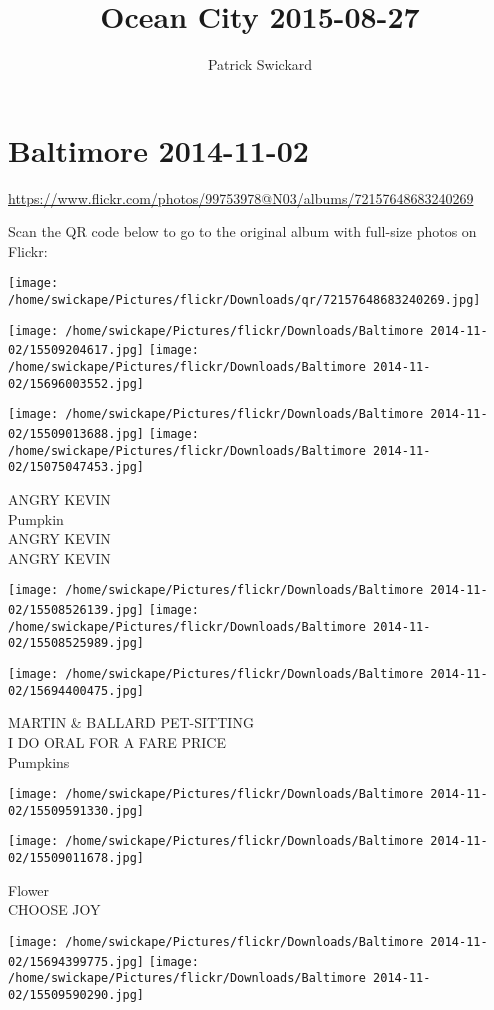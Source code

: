 \documentclass[10pt,letterpaper]{article}
\title{Ocean City 2015-08-27}
\author{Patrick Swickard}
\date{}
\begin{document}
\section*{Baltimore 2014-11-02}

\url{https://www.flickr.com/photos/99753978@N03/albums/72157648683240269}

Scan the QR code below to go to the original album with full-size photos on Flickr:

\texttt{[image: /home/swickape/Pictures/flickr/Downloads/qr/72157648683240269.jpg]}
\pagebreak

\texttt{[image: /home/swickape/Pictures/flickr/Downloads/Baltimore 2014-11-02/15509204617.jpg]}
\texttt{[image: /home/swickape/Pictures/flickr/Downloads/Baltimore 2014-11-02/15696003552.jpg]}

\texttt{[image: /home/swickape/Pictures/flickr/Downloads/Baltimore 2014-11-02/15509013688.jpg]}
\texttt{[image: /home/swickape/Pictures/flickr/Downloads/Baltimore 2014-11-02/15075047453.jpg]}

ANGRY KEVIN\\
Pumpkin\\
ANGRY KEVIN\\
ANGRY KEVIN
\pagebreak

\texttt{[image: /home/swickape/Pictures/flickr/Downloads/Baltimore 2014-11-02/15508526139.jpg]}
\texttt{[image: /home/swickape/Pictures/flickr/Downloads/Baltimore 2014-11-02/15508525989.jpg]}

\vspace{0.25in}
\texttt{[image: /home/swickape/Pictures/flickr/Downloads/Baltimore 2014-11-02/15694400475.jpg]}

MARTIN \& BALLARD PET{-}SITTING\\
I DO ORAL FOR A FARE PRICE\\
Pumpkins
\pagebreak

\texttt{[image: /home/swickape/Pictures/flickr/Downloads/Baltimore 2014-11-02/15509591330.jpg]}

\vspace{0.25in}
\texttt{[image: /home/swickape/Pictures/flickr/Downloads/Baltimore 2014-11-02/15509011678.jpg]}

Flower\\
CHOOSE JOY
\pagebreak

\texttt{[image: /home/swickape/Pictures/flickr/Downloads/Baltimore 2014-11-02/15694399775.jpg]}
\texttt{[image: /home/swickape/Pictures/flickr/Downloads/Baltimore 2014-11-02/15509590290.jpg]}
\end{document}
